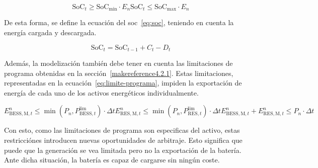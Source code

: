 \begin{subequations}%
  \label{eq:limite-soc}

  \begin{equation}
    \text{SoC}_{t} \ge \text{SoC}_{\text{min}} \cdot E_{n}
  \end{equation}

  \begin{equation}
    \text{SoC}_{t} \le \text{SoC}_{\text{max}} \cdot E_{n}
  \end{equation}

\end{subequations}

De esta forma, se define la ecuación del \gls{soc}~\ref{eq:soc}, teniendo en cuenta la energía cargada y descargada.

\begin{equation}%
  \label{eq:soc}
  \text{SoC}_{t} = \text{SoC}_{t - 1} + C_{t} - D_{t}
\end{equation}

Además, la modelización también debe tener en cuenta las limitaciones de programa obtenidas en la sección~\ref{makereference4.2.1}. Estas limitaciones, representadas en la ecuación~\ref{eq:limite-programa}, impiden la exportación de energía de cada uno de los activos energéticos individualmente.

\begin{subequations}%
  \label{eq:limite-programa}

  \begin{equation}
    E^{n}_{\text{BESS}, \text{M}, t} \le \min(P_{n}, P^{\text{lim}}_{\text{BESS}, t}) \cdot \Delta t
  \end{equation}

  \begin{equation}
    E^{n}_{\text{RES}, \text{M}, t} \le \min(P_{n}, P^{\text{lim}}_{\text{RES}, t}) \cdot \Delta t
  \end{equation}

  \begin{equation}
    E^{n}_{\text{BESS}, \text{M}, t} + E^{n}_{\text{RES}, \text{M}, t} \le P_{n} \cdot \Delta t
  \end{equation}

\end{subequations}


Con esto, como las limitaciones de programa son especificas del activo, estas restricciónes introducen nuevas oportunidades de arbitraje. Esto significa que puede que la generación se vea limitada pero no la exportación de la batería. Ante dicha situación, la batería es capaz de cargarse sin ningún coste.


